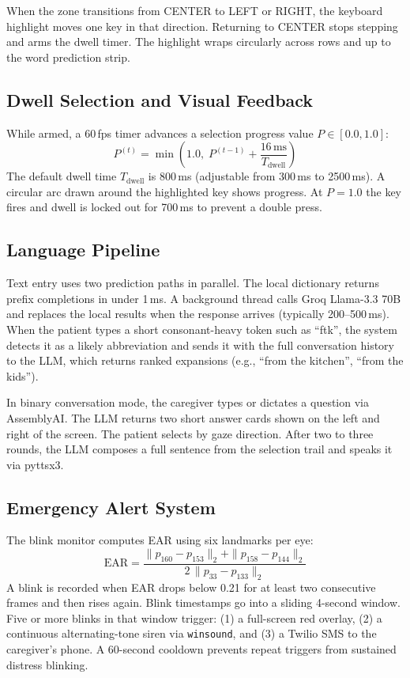 \documentclass[conference]{IEEEtran}
\begin{document}
When the zone transitions from CENTER to LEFT or RIGHT, the keyboard highlight moves one key in
that direction. Returning to CENTER stops stepping and arms the dwell timer. The highlight wraps
circularly across rows and up to the word prediction strip.

\subsection{Dwell Selection and Visual Feedback}
While armed, a 60\,fps timer advances a selection progress value $P \in [0.0, 1.0]$:
\begin{equation}
P^{(t)} = \min\!\left(1.0,\; P^{(t-1)} + \frac{16\,\text{ms}}{T_{\text{dwell}}}\right)
\end{equation}
The default dwell time $T_{\text{dwell}}$ is 800\,ms (adjustable from 300\,ms to 2500\,ms).
A circular arc drawn around the highlighted key shows progress. At $P = 1.0$ the key fires and
dwell is locked out for 700\,ms to prevent a double press.

\subsection{Language Pipeline}
Text entry uses two prediction paths in parallel. The local dictionary returns prefix
completions in under 1\,ms. A background thread calls Groq Llama-3.3 70B and replaces the
local results when the response arrives (typically 200--500\,ms). When the patient types a
short consonant-heavy token such as ``ftk'', the system detects it as a likely abbreviation and
sends it with the full conversation history to the LLM, which returns ranked expansions
(e.g., ``from the kitchen'', ``from the kids'').

In binary conversation mode, the caregiver types or dictates a question via AssemblyAI. The
LLM returns two short answer cards shown on the left and right of the screen. The patient
selects by gaze direction. After two to three rounds, the LLM composes a full sentence from
the selection trail and speaks it via pyttsx3.

\subsection{Emergency Alert System}
The blink monitor computes EAR using six landmarks per eye:
\begin{equation}
\text{EAR} = \frac{\|p_{160} - p_{153}\|_2 + \|p_{158} - p_{144}\|_2}{2\,\|p_{33} - p_{133}\|_2}
\end{equation}
A blink is recorded when EAR drops below 0.21 for at least two consecutive frames and then
rises again. Blink timestamps go into a sliding 4-second window. Five or more blinks in that
window trigger: (1) a full-screen red overlay, (2) a continuous alternating-tone siren via
\texttt{winsound}, and (3) a Twilio SMS to the caregiver's phone. A 60-second cooldown prevents
repeat triggers from sustained distress blinking.
\end{document}
